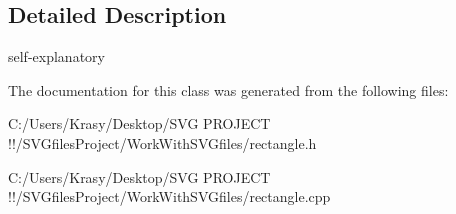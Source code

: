 \subsection{Detailed Description}
self-\/explanatory 

The documentation for this class was generated from the following files\+:\begin{DoxyCompactItemize}
\item 
C\+:/\+Users/\+Krasy/\+Desktop/\+S\+V\+G P\+R\+O\+J\+E\+C\+T !!/\+S\+V\+Gfiles\+Project/\+Work\+With\+S\+V\+Gfiles/rectangle.\+h\item 
C\+:/\+Users/\+Krasy/\+Desktop/\+S\+V\+G P\+R\+O\+J\+E\+C\+T !!/\+S\+V\+Gfiles\+Project/\+Work\+With\+S\+V\+Gfiles/rectangle.\+cpp\end{DoxyCompactItemize}
